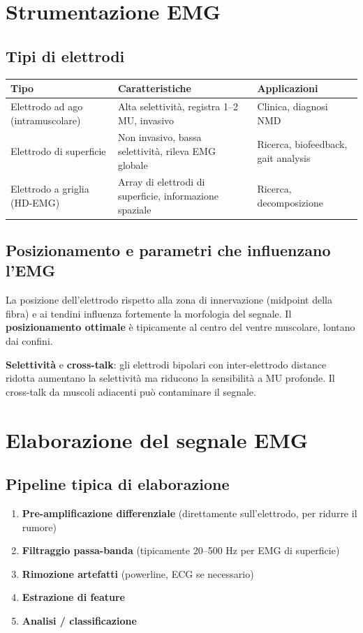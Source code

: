 \section{Strumentazione EMG}

\subsection{Tipi di elettrodi}

\begin{tabularx}{\linewidth}{lXX}
\toprule
\textbf{Tipo} & \textbf{Caratteristiche} & \textbf{Applicazioni} \\
\midrule
Elettrodo ad ago (intramuscolare) & Alta selettività, registra 1--2 MU, invasivo & Clinica, diagnosi NMD \\
Elettrodo di superficie & Non invasivo, bassa selettività, rileva EMG globale & Ricerca, biofeedback, gait analysis \\
Elettrodo a griglia (HD-EMG) & Array di elettrodi di superficie, informazione spaziale & Ricerca, decomposizione \\
\bottomrule
\end{tabularx}

\subsection{Posizionamento e parametri che influenzano l'EMG}

La posizione dell'elettrodo rispetto alla zona di innervazione (midpoint della fibra) e ai tendini influenza fortemente la morfologia del segnale. Il \textbf{posizionamento ottimale} è tipicamente al centro del ventre muscolare, lontano dai confini.

\textbf{Selettività} e \textbf{cross-talk}: gli elettrodi bipolari con inter-elettrodo distance ridotta aumentano la selettività ma riducono la sensibilità a MU profonde. Il cross-talk da muscoli adiacenti può contaminare il segnale.

\section{Elaborazione del segnale EMG}

\subsection{Pipeline tipica di elaborazione}

\begin{enumerate}
    \item \textbf{Pre-amplificazione differenziale} (direttamente sull'elettrodo, per ridurre il rumore)
    \item \textbf{Filtraggio passa-banda} (tipicamente 20--500 Hz per EMG di superficie)
    \item \textbf{Rimozione artefatti} (powerline, ECG se necessario)
    \item \textbf{Estrazione di feature}
    \item \textbf{Analisi / classificazione}
\end{enumerate}

